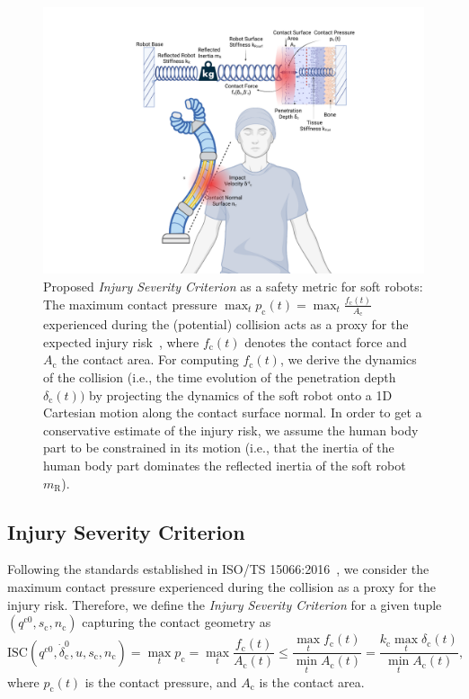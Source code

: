 \begin{figure}[h!]
    \centering
    \includegraphics[width=0.9\linewidth]{safetymetric/figures/injury_severity_criterion.pdf}
    \caption{Proposed \emph{Injury Severity Criterion} as a safety metric for soft robots: The maximum contact pressure $\max_t p_\mathrm{c}(t) = \max_t \frac{f_\mathrm{c}(t)}{A_\mathrm{c}}$ experienced during the (potential) collision acts as a proxy for the expected injury risk~\citep{Isots_15066_2016}, where $f_\mathrm{c}(t)$ denotes the contact force and $A_\mathrm{c}$ the contact area. For computing $f_\mathrm{c}(t)$, we derive the dynamics of the collision (i.e., the time evolution of the penetration depth $\delta_\mathrm{c}(t))$ by projecting the dynamics of the soft robot onto a 1D Cartesian motion along the contact surface normal. In order to get a conservative estimate of the injury risk, we assume the human body part to be constrained in its motion (i.e., that the inertia of the human body part dominates the reflected inertia of the soft robot $m_\mathrm{R}$).}
    \label{fig:safetymetric:injury_severity_criterion}
\end{figure}

\subsection{Injury Severity Criterion}
Following the standards established in ISO/TS 15066:2016~\citep{Isots_15066_2016}, we consider the maximum contact pressure experienced during the collision as a proxy for the injury risk. Therefore, we define the \emph{Injury Severity Criterion} for a given tuple $(q^{\mathrm{c}0},s_\mathrm{c}, n_\mathrm{c})$ capturing the contact geometry as
\begin{equation}
    \mathrm{ISC}(q^{\mathrm{c}0},\dot{\delta}_\mathrm{c}^0,u,s_\mathrm{c},n_\mathrm{c}) = \max_t p_\mathrm{c} = \max_t \frac{f_\mathrm{c}(t)}{A_\mathrm{c}(t)} \leq \frac{\max_t f_\mathrm{c}(t)}{\min_t A_\mathrm{c}(t)} =  \frac{k_\mathrm{c} \max_t \delta_\mathrm{c}(t)}{\min_t A_\mathrm{c}(t)},
\end{equation}
where $p_\mathrm{c}(t)$ is the contact pressure, and $A_\mathrm{c}$ is the contact area.

